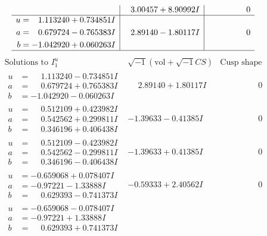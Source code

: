 \documentclass[1p]{elsarticle_modified}
\theoremstyle{definition}
\newcommand{\I}{\sqrt{-1}}
\begin{document}
$$\begin{array}{c|c|c}
 & \phantom{-}3.00457 + 8.90992 I & \phantom{-0.000000 } 0 \\ \hline\begin{aligned}
u &= \phantom{-}1.113240 + 0.734851 I \\
a &= \phantom{-}0.679724 - 0.765383 I \\
b &= -1.042920 + 0.060263 I\end{aligned}
 & \phantom{-}2.89140 - 1.80117 I & \phantom{-0.000000 } 0\\
 \hline 
 \end{array}$$\newpage$$\begin{array}{c|c|c}  
\text{Solutions to }I^u_{1}& \I (\text{vol} + \sqrt{-1}CS) & \text{Cusp shape}\\
 \hline 
\begin{aligned}
u &= \phantom{-}1.113240 - 0.734851 I \\
a &= \phantom{-}0.679724 + 0.765383 I \\
b &= -1.042920 - 0.060263 I\end{aligned}
 & \phantom{-}2.89140 + 1.80117 I & \phantom{-0.000000 } 0 \\ \hline\begin{aligned}
u &= \phantom{-}0.512109 + 0.423982 I \\
a &= \phantom{-}0.542562 + 0.299811 I \\
b &= \phantom{-}0.346196 + 0.406438 I\end{aligned}
 & -1.39633 - 0.41385 I & \phantom{-0.000000 } 0 \\ \hline\begin{aligned}
u &= \phantom{-}0.512109 - 0.423982 I \\
a &= \phantom{-}0.542562 - 0.299811 I \\
b &= \phantom{-}0.346196 - 0.406438 I\end{aligned}
 & -1.39633 + 0.41385 I & \phantom{-0.000000 } 0 \\ \hline\begin{aligned}
u &= -0.659068 + 0.078407 I \\
a &= -0.97221 - 1.33888 I \\
b &= \phantom{-}0.629393 - 0.741373 I\end{aligned}
 & -0.59333 + 2.40562 I & \phantom{-0.000000 } 0 \\ \hline\begin{aligned}
u &= -0.659068 - 0.078407 I \\
a &= -0.97221 + 1.33888 I \\
b &= \phantom{-}0.629393 + 0.741373 I\end{aligned}

\end{array}$$
\end{document}
